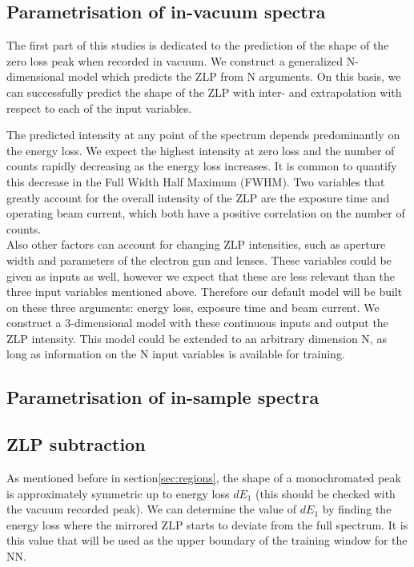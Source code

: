 \subsection{Parametrisation of in-vacuum spectra}


The first part of this studies is dedicated to the prediction of the shape of the zero loss peak when recorded in vacuum. We construct a generalized N-dimensional model which predicts the ZLP from N arguments. On this basis, we can successfully predict the shape of the ZLP with inter- and extrapolation with respect to each of the input variables. 

The predicted intensity at any point of the spectrum depends predominantly on the energy loss. We expect the highest intensity at zero loss and the number of counts rapidly decreasing as the energy loss increases. It is common to quantify this decrease in the Full Width Half Maximum (FWHM). Two variables that greatly account for the overall intensity of the ZLP are the exposure time and operating beam current, which both have a positive correlation on the number of counts. \\
Also other factors can account for changing ZLP intensities, such as aperture width and parameters of the electron gun and lenses. These variables could be given as inputs as well, however we expect that these are less relevant than the three input variables mentioned above. Therefore our default model will be built on these three arguments: energy loss, exposure time and beam current. We construct a 3-dimensional model with these continuous inputs and output the ZLP intensity. This model could be extended to an arbitrary dimension N, as long as information on the N input variables is available for training.



\subsection{Parametrisation of in-sample spectra}


\subsection{ZLP subtraction}
\label{sec:subtraction}

As mentioned before in section\ref{sec:regions}, the shape of a monochromated peak is approximately symmetric up to energy loss $dE_1$ (this should be checked with the vacuum recorded peak). We can determine the value of $dE_1$ by finding the energy loss where the mirrored ZLP starts to deviate from the full spectrum. It is this value that will be used as the upper boundary of the training window for the NN. \\

